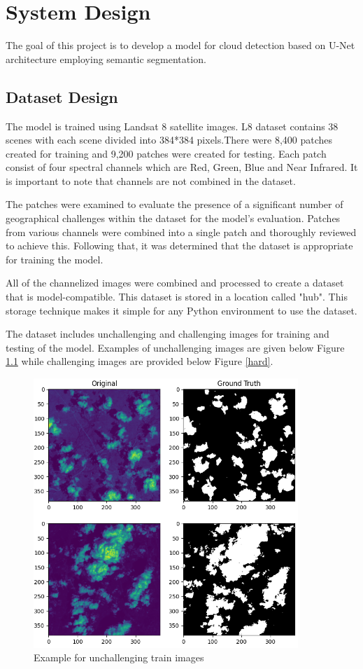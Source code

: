 \chapter{System Design}

The goal of this project is to develop a model for cloud detection based on U-Net architecture employing semantic segmentation.

\section{Dataset Design}

The model is trained using Landsat 8 satellite images. L8 dataset contains 38 scenes with each scene divided into 384*384 pixels.There were 8,400 patches created for training and 9,200 patches were created for testing. Each patch consist of four spectral channels which are Red, Green, Blue and Near Infrared. It is important to note that channels are not combined in the dataset. 

The patches were examined to evaluate the presence of a significant number of geographical challenges within the dataset for the model's evaluation. Patches from various channels were combined into a single patch and thoroughly reviewed to achieve this. Following that, it was determined that the dataset is appropriate for training the model.

All of the channelized images were combined and processed to create a dataset that is model-compatible.  This dataset is stored in a location called "hub". This storage technique makes it simple for any Python environment to use the dataset.

The dataset includes unchallenging and challenging images for training and testing of the model. Examples of unchallenging images are given below Figure \ref{easy} while challenging images are provided below Figure \ref{hard}. 

\begin{figure}[htp]
    \centering
    \includegraphics[width=10cm]{projectChapters/images/easy.png}
    \caption{Example for unchallenging train images}
    \label{easy}
\end{figure}

